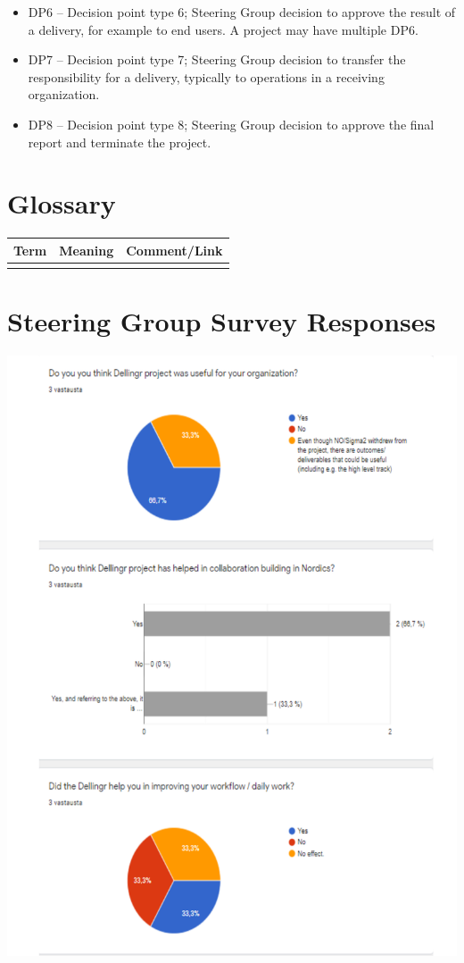 \documentclass{article}
\begin{document}
\begin{appendices}
\begin{itemize}
\item DP6 – Decision point type 6; Steering Group decision to approve the result of a delivery, for example to end users. A project may have multiple DP6.

\item DP7 – Decision point type 7; Steering Group decision to transfer the responsibility for a delivery, typically to operations in a receiving organization.

\item DP8 – Decision point type 8; Steering Group decision to approve the final report and terminate the project.

\end{itemize}


\section{Glossary}
\begin{tabular}{l|l|l}
Term & Meaning & Comment/Link \\ \hline
 & &  \\ \hline
\end{tabular}

\section{Steering Group Survey Responses}
\label{app:sg-resp}

\begin{center}
\includegraphics[scale=0.7]{SG_responses_1.pdf}
\end{center}


\end{appendices}
\end{document}
